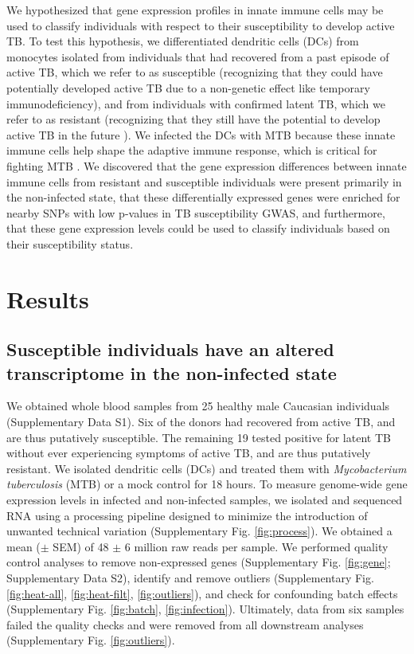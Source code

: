 \documentclass[fleqn,10pt]{wlscirep}
\begin{document}
We hypothesized that gene expression profiles in innate immune cells
may be used to classify individuals with respect to their
susceptibility to develop active TB. To test this hypothesis, we
differentiated dendritic cells (DCs) from monocytes isolated from
individuals that had recovered from a past episode of active TB, which
we refer to as susceptible (recognizing that they could have
potentially developed active TB due to a non-genetic effect like
temporary immunodeficiency), and from individuals with confirmed
latent TB, which we refer to as resistant (recognizing that they still
have the potential to develop active TB in the future
\cite{Loddenkemper2016}). We infected the DCs with MTB because these
innate immune cells help shape the adaptive immune response, which is
critical for fighting MTB \cite{Cooper2009, Barreiro2012}. We
discovered that the gene expression differences between innate immune
cells from resistant and susceptible individuals were present
primarily in the non-infected state, that these differentially
expressed genes were enriched for nearby SNPs with low p-values in TB
susceptibility GWAS, and furthermore, that these gene expression
levels could be used to classify individuals based on their
susceptibility status.
\section*{Results}

\subsection*{Susceptible individuals have an altered transcriptome in the non-infected state}

We obtained whole blood samples from 25 healthy male Caucasian
individuals (Supplementary Data S1). Six of the donors had recovered
from active TB, and are thus putatively susceptible. The remaining 19
tested positive for latent TB without ever experiencing symptoms of
active TB, and are thus putatively resistant. We isolated dendritic
cells (DCs) and treated them with \emph{Mycobacterium
}\emph{tuberculosis} (MTB) or a mock control for 18 hours. To measure
genome-wide gene expression levels in infected and non-infected
samples, we isolated and sequenced RNA using a processing pipeline
designed to minimize the introduction of unwanted technical variation
(Supplementary Fig. \ref{fig:process}). We obtained a mean ($\pm$ SEM)
of 48 $\pm$ 6 million raw reads per sample. We performed quality
control analyses to remove non-expressed genes (Supplementary Fig.
\ref{fig:gene}; Supplementary Data S2), identify and remove outliers
(Supplementary Fig. \ref{fig:heat-all}, \ref{fig:heat-filt},
\ref{fig:outliers}), and check for confounding batch effects
(Supplementary Fig. \ref{fig:batch}, \ref{fig:infection}). Ultimately,
data from six samples failed the quality checks and were removed from
all downstream analyses (Supplementary Fig. \ref{fig:outliers}).
\end{document}
